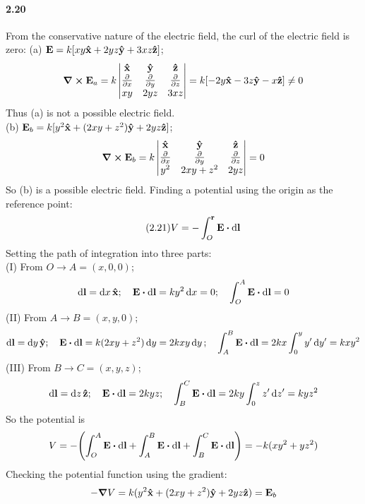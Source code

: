 \documentclass[../main.tex]{subfiles}
\begin{document}
\paragraph{2.20}
From the conservative nature of the electric field, the curl of the electric field is zero:
(a) \( \vb{E} = k[xy \vu{x} + 2yz \vu{y} + 3xz \vu{z}] \);
\[
    \curl{\vb{E}}_a = k \begin{vmatrix}
        \vu{x} & \vu{y} & \vu{z} \\
        \pdv{x} & \pdv{y} & \pdv{z} \\
    xy & 2yz & 3xz
    \end{vmatrix}
    = k [-2y \vu{x} - 3z \vu{y} - x \vu{z}] \neq 0
\]
Thus (a) is not a possible electric field. \\
(b) \( \vb{E}_b = k[y^2 \vu{x} + (2xy + z^2) \vu{y} + 2yz \vu{z}] \);
\[
    \curl \vb{E}_b = k \begin{vmatrix}
        \vu{x} & \vu{y} & \vu{z} \\
        \pdv{x} & \pdv{y} & \pdv{z} \\
        y^2 & 2xy + z^2 & 2yz    
    \end{vmatrix}
    = 0
\]
So (b) is a possible electric field. Finding a potential using the origin as the reference point:
\[ \tag{2.21} \label{eq:2_21}
    V = - \int_O^{\vb{r}} \vb{E} \vdot \dd{\vb{l}}
\]
Setting the path of integration into three parts: \\
(I) From $O \to A = (x,0, 0)$;
\[
    \dd{\vb{l}} = \dd{x} \vu{x}; \quad \vb{E} \vdot \dd{\vb{l}} = ky^2 \dd{x} = 0; \quad
    \int_O^A \vb{E} \vdot \dd{\vb{l}} = 0
\]
(II) From $A \to B = (x,y,0)$;
\[
    \dd{\vb{l}} = \dd{y} \vu{y}; \quad \vb{E} \vdot \dd{\vb{l}} = k(2xy + z^2) \dd{y} = 2kxy \dd{y};
    \quad \int_A^B \vb{E} \vdot \dd{\vb{l}} = 2kx \int_0^y y' \dd{y'} = kxy^2
\]
(III) From $B \to C = (x,y,z)$;
\[
    \dd{\vb{l}} = \dd{z} \vu{z}; \quad \vb{E} \vdot \dd{\vb{l}} = 2kyz; \quad
    \int_B^C \vb{E} \vdot \dd{\vb{l}} = 2ky \int_0^z z' \dd{z'} = kyz^2
\]
So the potential is
\begin{align*}
    V = - \qt( \int_O^A \vb{E} \vdot \dd{\vb{l}} + \int_A^B \vb{E} \vdot \dd{\vb{l}}
        + \int_B^C \vb{E} \vdot \dd{\vb{l}} ) = -k(xy^2 + yz^2)
\end{align*}
Checking the potential function using the gradient:
\[
    -\grad V = k(y^2 \vu{x} + (2xy + z^2) \vu{y} + 2yz \vu{z}) = \vb{E}_b
\]
\end{document}
